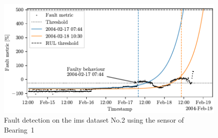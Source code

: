 \begin{figure}
    \centering
    \includegraphics{images/IMS/Test02/FD.pdf}
    \caption{Fault detection on the \gls{ims} dataset No.2 using the sensor of Bearing~1}
    \label{fig:IMS_n2_3x_fd}
\end{figure}

\todo